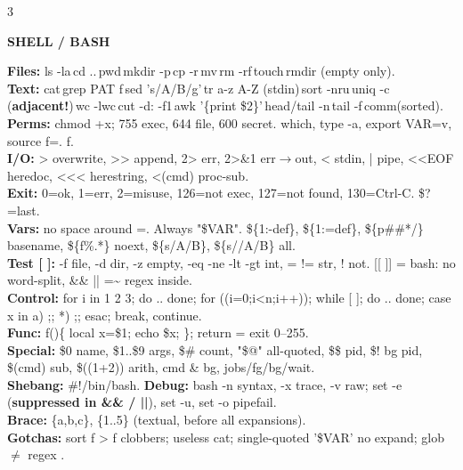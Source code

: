 \documentclass[10pt,letterpaper]{article}
\newenvironment{topic}[1]{%
  \par\addvspace{1.5pt}%
  \noindent\colorbox{hdrBG}{%
    \begin{minipage}{\dimexpr\linewidth-2\fboxsep\relax}%
      \centering\bfseries\sffamily\fontsize{6pt}{7pt}\selectfont\color{hdrFG}\MakeUppercase{#1}%
    \end{minipage}%
  }\par\nobreak\vskip0.5pt%
  \begingroup\setlength{\leftskip}{0pt}\setlength{\rightskip}{0pt}%
}{%
  \endgroup\par\addvspace{0.5pt}%
}
\newcommand{\warn}[1]{\textcolor{warnC}{\textbf{#1}}}
\newcommand{\hd}[1]{\textcolor{accent}{\textbf{#1}}}
\newcommand{\cn}[1]{{\ttfamily\small #1}}
\begin{document}
\fontsize{5.6pt}{6.4pt}\selectfont

\begin{multicols*}{3}

\begin{topic}{Shell / Bash}
\hd{Files:} \cn{ls -la}\,\cn{cd ..}\,\cn{pwd}\,\cn{mkdir -p}\,\cn{cp -r}\,\cn{mv}\,\cn{rm -rf}\,\cn{touch}\,\cn{rmdir} (empty only).\\
\hd{Text:} \cn{cat}\,\cn{grep PAT f}\,\cn{sed 's/A/B/g'}\,\cn{tr a-z A-Z} (stdin)\,\cn{sort -nru}\,\cn{uniq -c} (\warn{adjacent!})\,\cn{wc -lwc}\,\cn{cut -d: -f1}\,\cn{awk '\{print \$2\}'}\,\cn{head/tail -n}\,\cn{tail -f}\,\cn{comm}(sorted).\\
\hd{Perms:} \cn{chmod +x}; 755 exec, 644 file, 600 secret. \cn{which}, \cn{type -a}, \cn{export VAR=v}, \cn{source f}=\cn{. f}.\\
\hd{I/O:} \cn{>} overwrite, \cn{>>} append, \cn{2>} err, \cn{2>\&1} err$\to$out, \cn{<} stdin, \cn{|} pipe, \cn{<<EOF} heredoc, \cn{<<<} herestring, \cn{<(cmd)} proc-sub.\\
\hd{Exit:} 0=ok, 1=err, 2=misuse, 126=not exec, 127=not found, 130=Ctrl-C. \cn{\$?}=last.\\
\hd{Vars:} no space around \cn{=}. Always \cn{"\$VAR"}. \cn{\$\{1:-def\}}, \cn{\$\{1:=def\}}, \cn{\$\{p\#\#*/\}} basename, \cn{\$\{f\%.*\}} noext, \cn{\$\{s/A/B\}}, \cn{\$\{s//A/B\}} all.\\
\hd{Test [ ]:} \cn{-f} file, \cn{-d} dir, \cn{-z} empty, \cn{-eq -ne -lt -gt} int, \cn{= !=} str, \cn{!} not. \cn{[[ ]]} = bash: no word-split, \cn{\&\&} \cn{||} \cn{=\textasciitilde} regex inside.\\
\hd{Control:} \cn{for i in 1 2 3; do .. done}; \cn{for ((i=0;i<n;i++))}; \cn{while [ ]; do .. done}; \cn{case x in a) ;; *) ;; esac}; \cn{break}, \cn{continue}.\\
\hd{Func:} \cn{f()\{ local x=\$1; echo \$x; \}}; \cn{return} = exit 0--255.\\
\hd{Special:} \cn{\$0} name, \cn{\$1..\$9} args, \cn{\$\#} count, \cn{"\$@"} all-quoted, \cn{\$\$} pid, \cn{\$!} bg pid, \cn{\$(cmd)} sub, \cn{\$((1+2))} arith, \cn{cmd \&} bg, \cn{jobs/fg/bg/wait}.\\
\hd{Shebang:} \cn{\#!/bin/bash}. \hd{Debug:} \cn{bash -n} syntax, \cn{-x} trace, \cn{-v} raw; \cn{set -e} (\warn{suppressed in \&\& / ||}), \cn{set -u}, \cn{set -o pipefail}.\\
\hd{Brace:} \cn{\{a,b,c\}}, \cn{\{1..5\}} (textual, before all expansions).\\
\warn{Gotchas:} \cn{sort f > f} clobbers; useless \cn{cat}; single-quoted \cn{'\$VAR'} no expand; glob \cn{*} $\neq$ regex \cn{*}.
\end{topic}


\end{multicols*}
\end{document}
